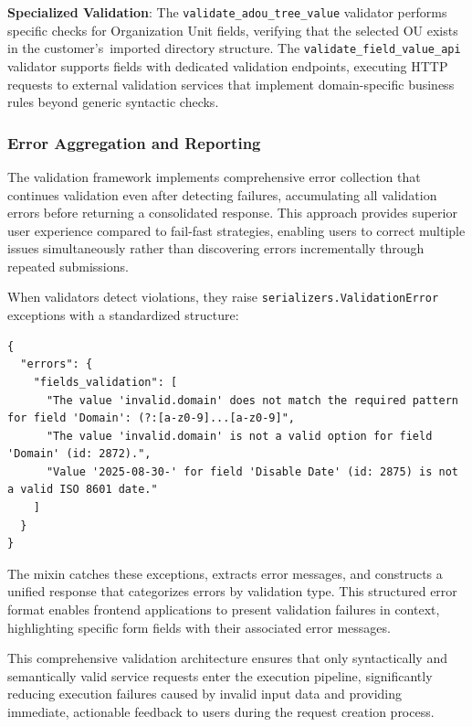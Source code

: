 \textbf{Specialized Validation}: The \texttt{validate\_adou\_tree\_value} validator performs specific checks for Organization Unit fields, verifying that the selected OU exists in the customer's~imported directory structure. The \texttt{validate\_field\_value\_api} validator supports fields with dedicated validation endpoints, executing HTTP requests to external validation services that implement domain-specific business rules beyond generic syntactic checks.

\subsubsection{Error Aggregation and Reporting}

The validation framework implements comprehensive error collection that continues validation even after detecting failures, accumulating all validation errors before returning a consolidated response. This approach provides superior user experience compared to fail-fast strategies, enabling users to correct multiple issues simultaneously rather than discovering errors incrementally through repeated submissions.

When validators detect violations, they raise \texttt{serializers.ValidationError} exceptions with a standardized structure:

\begin{verbatim}
{
  "errors": {
    "fields_validation": [
      "The value 'invalid.domain' does not match the required pattern for field 'Domain': (?:[a-z0-9]...[a-z0-9]",
      "The value 'invalid.domain' is not a valid option for field 'Domain' (id: 2872).",
      "Value '2025-08-30-' for field 'Disable Date' (id: 2875) is not a valid ISO 8601 date."
    ]
  }
}
\end{verbatim}

The mixin catches these exceptions, extracts error messages, and constructs a unified response that categorizes errors by validation type. This structured error format enables frontend applications to present validation failures in context, highlighting specific form fields with their associated error messages.

This comprehensive validation architecture ensures that only syntactically and semantically valid service requests enter the execution pipeline, significantly reducing execution failures caused by invalid input data and providing immediate, actionable feedback to users during the request creation process.



